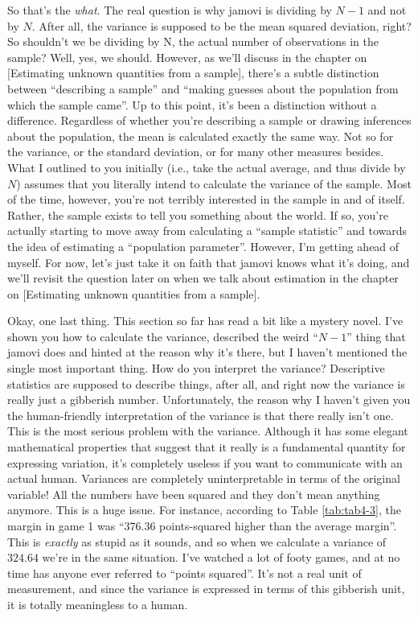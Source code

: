 \documentclass[
]{book}
\begin{document}
So that's the \emph{what}. The real question is why jamovi is dividing by \(N - 1\) and not by \(N\). After all, the variance is supposed to be the mean squared deviation, right? So shouldn't we be dividing by N, the actual number of observations in the sample? Well, yes, we should. However, as we'll discuss in the chapter on {[}Estimating unknown quantities from a sample{]}, there's a subtle distinction between ``describing a sample'' and ``making guesses about the population from which the sample came''. Up to this point, it's been a distinction without a difference. Regardless of whether you're describing a sample or drawing inferences about the population, the mean is calculated exactly the same way. Not so for the variance, or the standard deviation, or for many other measures besides. What I outlined to you initially (i.e., take the actual average, and thus divide by \(N\)) assumes that you literally intend to calculate the variance of the sample. Most of the time, however, you're not terribly interested in the sample in and of itself. Rather, the sample exists to tell you something about the world. If so, you're actually starting to move away from calculating a ``sample statistic'' and towards the idea of estimating a ``population parameter''. However, I'm getting ahead of myself. For now, let's just take it on faith that jamovi knows what it's doing, and we'll revisit the question later on when we talk about estimation in the chapter on {[}Estimating unknown quantities from a sample{]}.

Okay, one last thing. This section so far has read a bit like a mystery novel. I've shown you how to calculate the variance, described the weird ``\(N - 1\)'' thing that jamovi does and hinted at the reason why it's there, but I haven't mentioned the single most important thing. How do you interpret the variance? Descriptive statistics are supposed to describe things, after all, and right now the variance is really just a gibberish number. Unfortunately, the reason why I haven't given you the human-friendly interpretation of the variance is that there really isn't one. This is the most serious problem with the variance. Although it has some elegant mathematical properties that suggest that it really is a fundamental quantity for expressing variation, it's completely useless if you want to communicate with an actual human. Variances are completely uninterpretable in terms of the original variable! All the numbers have been squared and they don't mean anything anymore. This is a huge issue. For instance, according to Table \ref{tab:tab4-3}, the margin in game 1 was ``376.36 points-squared higher than the average margin''. This is \emph{exactly} as stupid as it sounds, and so when we calculate a variance of \(324.64\) we're in the same situation. I've watched a lot of footy games, and at no time has anyone ever referred to ``points squared''. It's not a real unit of measurement, and since the variance is expressed in terms of this gibberish unit, it is totally meaningless to a human.
\end{document}

